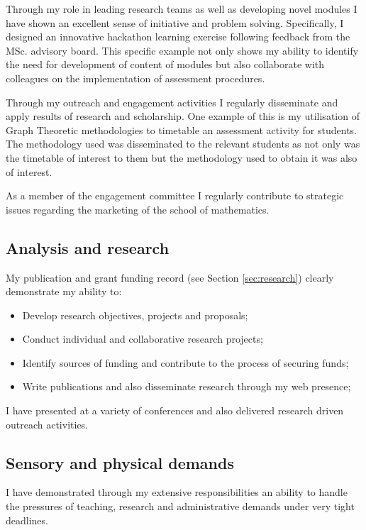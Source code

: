 \documentclass{article}
\begin{document}
Through my role in leading research teams as well as developing novel modules I have shown an excellent sense of initiative and problem solving.
Specifically, I designed an innovative hackathon learning exercise following feedback from the MSc. advisory board.
This specific example not only shows my ability to identify the need for development of content of modules but also collaborate with colleagues on the implementation of assessment procedures.

Through my outreach and engagement activities I regularly disseminate and apply results of research and scholarship.
One example of this is my utilisation of Graph Theoretic methodologies to timetable an assessment activity for students.
The methodology used was disseminated to the relevant students as not only was the timetable of interest to them but the methodology used to obtain it was also of interest.

As a member of the engagement committee I regularly contribute to strategic issues regarding the marketing of the school of mathematics.

\subsection{Analysis and research}

My publication and grant funding record (see Section \ref{sec:research}) clearly demonstrate my ability to:

\begin{itemize}
    \item Develop research objectives, projects and proposals;
    \item Conduct individual and collaborative research projects;
    \item Identify sources of funding and contribute to the process of securing funds;
    \item Write publications and also disseminate research through my web presence;
\end{itemize}

I have presented at a variety of conferences and also delivered research driven outreach activities.

\subsection{Sensory and physical demands}

I have demonstrated through my extensive responsibilities an ability to handle the pressures of teaching, research and administrative demands under very tight deadlines.
\end{document}
